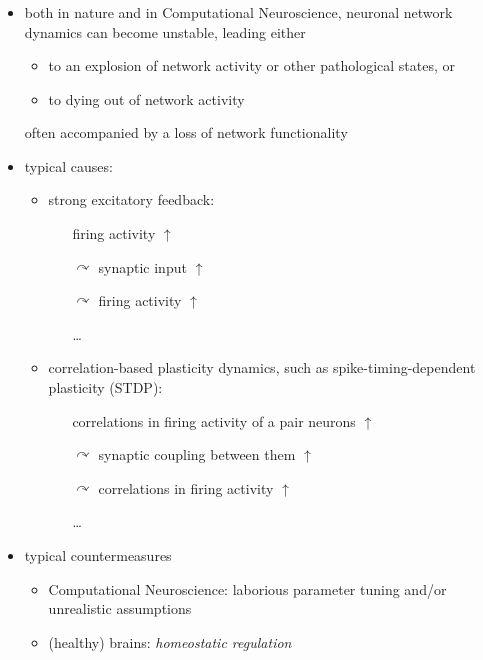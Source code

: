 \documentclass[8pt,t,usepdftitle=false]{beamer}
\begin{document}
\begin{frame}[t,plain]
  \frametitle{\ttl}
  \begin{itemize}\itemsep1ex
  \item<1-> both in nature and in Computational Neuroscience, neuronal network dynamics can become unstable, leading either
    \begin{itemize}\itemsep1ex
    \item to an explosion of network activity or other pathological states, or
    \item to dying out of network activity
    \end{itemize}
    often accompanied by a loss of network functionality
  \item<2-> typical causes:
    \begin{itemize}\itemsep1ex
    \item<2-> strong excitatory feedback:
      \begin{itemize}\itemsep1ex
      \item[] firing activity $\uparrow$
      \item[$\curvearrowright$]
        synaptic input $\uparrow$
      \item[$\curvearrowright$]
        firing activity $\uparrow$
      \item[\ldots]
      \end{itemize}
    \item<3-> correlation-based plasticity dynamics, such as spike-timing-dependent plasticity (STDP):
      \begin{itemize}\itemsep1ex
      \item[] correlations in firing activity of a pair neurons $\uparrow$
      \item[$\curvearrowright$] synaptic coupling between them $\uparrow$
      \item[$\curvearrowright$] correlations in firing activity  $\uparrow$
      \item[\ldots]
      \end{itemize}
    \end{itemize}
  \item<4-> typical countermeasures
    \begin{itemize}\itemsep1ex
    \item Computational Neuroscience: laborious parameter tuning and/or unrealistic assumptions
    \item (healthy) brains: \emph{homeostatic regulation}
    \end{itemize}
  \end{itemize}
\end{frame}
\end{document}
